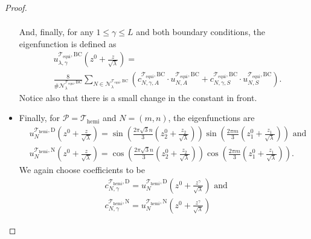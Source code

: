 \documentclass{amsart}
\theoremstyle{definition}
\theoremstyle{remark}
\renewcommand\leq\leqslant
\numberwithin{equation}{section}
\theoremstyle{definition}
\theoremstyle{remark}
\begin{document}
\begin{proof}
\begin{itemize}
\begin{equation}
\begin{aligned}
			\end{aligned}
		\end{equation}
		And, finally, for any $1\leq\gamma\leq L$ and both boundary conditions, the eigenfunction is defined as \begin{equation}
			\begin{aligned}
				&u_{\lambda,\gamma}^{	\mathcal{T}_\mathrm{equi},\mathrm{BC}}\left(z^0+\frac{z}{\sqrt{\lambda}}\right)=\\&\frac{8}{\#\mathcal{N}_\lambda^{	\mathcal{T}_\mathrm{equi},\mathrm{BC}}}\sum_{N\in\mathcal{N}_\lambda^{	\mathcal{T}_\mathrm{equi},\mathrm{BC}}}\left(c_{N,\gamma,A}^{	\mathcal{T}_\mathrm{equi},\mathrm{BC}}\cdot u_{N,A}^{	\mathcal{T}_\mathrm{equi},\mathrm{BC}}+c_{N,\gamma,S}^{	\mathcal{T}_\mathrm{equi},\mathrm{BC}}\cdot u_{N,S}^{	\mathcal{T}_\mathrm{equi},\mathrm{BC}}\right).
			\end{aligned}
		\end{equation}
		Notice also that there is a small change in the constant in front.
		
		\item Finally, for $\mathcal{P}=\mathcal{T}_\mathrm{hemi}$ and $N=(m,n)$, the eigenfunctions are
		\begin{equation}
			\begin{aligned}
				&u^{\mathcal{T}_\mathrm{hemi},\mathrm{D}}_{N}\left(z^0+\frac{z}{\sqrt{\lambda}}\right)=\sin\left(\frac{2\pi\sqrt{3}n}{3}\left(z^0_2+\frac{z_2}{\sqrt{\lambda}}\right)\right)\sin\left(\frac{2\pi m}{3}\left(z^0_1+\frac{z_1}{\sqrt{\lambda}}\right)\right)\text{ and }\\
				&u^{\mathcal{T}_\mathrm{hemi},\mathrm{N}}_{N}\left(z^0+\frac{z}{\sqrt{\lambda}}\right)=\cos\left(\frac{2\pi\sqrt{3}n}{3}\left(z^0_2+\frac{z_2}{\sqrt{\lambda}}\right)\right)\cos\left(\frac{2\pi m}{3}\left(z^0_1+\frac{z_1}{\sqrt{\lambda}}\right)\right).
			\end{aligned}
		\end{equation}
		We again choose coefficients to be
		\begin{equation}
			\begin{aligned}
				&c_{N,\gamma}^{\mathcal{T}_\mathrm{hemi},\mathrm{D}}=u^{\mathcal{T}_\mathrm{hemi},\mathrm{D}}_{N}\left(z^0+\frac{z^\gamma}{\sqrt{\lambda}}\right)\text{ and }\\
				&c_{N,\gamma}^{\mathcal{T}_\mathrm{hemi},\mathrm{N}}=u^{\mathcal{T}_\mathrm{hemi},\mathrm{N}}_{N}\left(z^0+\frac{z^\gamma}{\sqrt{\lambda}}\right)\end{aligned}
		\end{equation}
	\end{itemize}
	

\end{proof}
\end{document}

